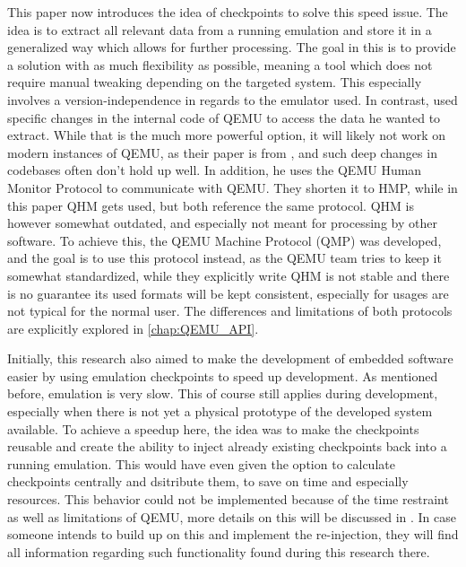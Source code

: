 This paper now introduces the idea of checkpoints to solve this speed issue.
The idea is to extract all relevant data from a running emulation
and store it in a generalized way which allows for further processing.
The goal in this is to provide a solution with as much flexibility as possible,
meaning a tool which does not require manual tweaking depending on the targeted system.
This especially involves a version-independence in regards to the emulator used.
In contrast,  used specific changes in the internal code of QEMU
to access the data he wanted to extract.
While that is the much more powerful option, it will likely not work on modern instances of QEMU,
as their paper is from \citeyear{kitcheckpoints}, and such deep changes in codebases often don't hold up well.
In addition, he uses the QEMU Human Monitor Protocol to communicate with QEMU.
They shorten it to HMP, while in this paper QHM gets used, but both reference the same protocol.
QHM is however somewhat outdated, and especially not meant for processing by other software.
To achieve this, the QEMU Machine Protocol (QMP) was developed, and the goal is to use this protocol instead,
as the QEMU team tries to keep it somewhat standardized,
while they explicitly write QHM is not stable and there is no guarantee its used formats will be kept consistent,
especially for usages are not typical for the normal user.
The differences and limitations of both protocols are explicitly explored in \autoref{chap:QEMU_API}.

Initially, this research also aimed to make the development of embedded software easier by using emulation checkpoints to speed up development.
As mentioned before, emulation is very slow.
This of course still applies during development, especially when there is not yet a physical prototype of the developed system available.
To achieve a speedup here, the idea was to make the checkpoints reusable
and create the ability to inject already existing checkpoints back into a running emulation.
This would have even given the option to calculate checkpoints centrally and dsitribute them,
to save on time and especially resources.
This behavior could not be implemented because of the time restraint as well as limitations of QEMU,
more details on this will be discussed in .
In case someone intends to build up on this and implement the re-injection,
they will find all information regarding such functionality found during this research there.